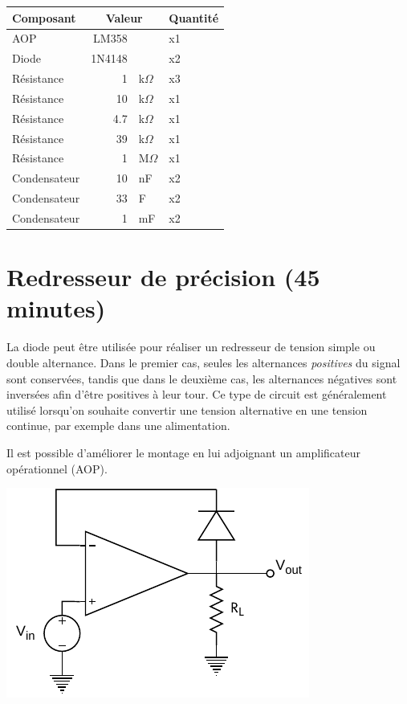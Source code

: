 \documentclass{../template/labo}
\begin{document}
\begin{center}
	\begin{tabular}{p{}rlp{}}
		Composant & \multicolumn{2}{c}{Valeur} & Quantité \\\toprule
		\multirow{1}{*}{AOP} & LM358 & & x1 \\\midrule
		\multirow{1}{*}{Diode} & 1N4148 & & x2 \\\midrule
		\multirow{1}{*}{Résistance} 	& 1 & k$\Omega$ & x3 \\\midrule
		\multirow{1}{*}{Résistance} 	& 10 & k$\Omega$ & x1 \\\midrule
		\multirow{1}{*}{Résistance} 	& 4.7 & k$\Omega$ & x1 \\\midrule
		\multirow{1}{*}{Résistance} 	& 39 & k$\Omega$ & x1 \\\midrule
		\multirow{1}{*}{Résistance} 	& 1 & M$\Omega$ & x1 \\\midrule
		\multirow{1}{*}{Condensateur} 	& 10 & nF & x2 \\\midrule
		\multirow{1}{*}{Condensateur} 	& 33 & \textmu F & x2 \\\midrule
		\multirow{1}{*}{Condensateur} 	& 1 & mF & x2 \\\bottomrule
	\end{tabular}
\end{center}

\section{Redresseur de précision (45 minutes)}
La diode peut être utilisée pour réaliser un redresseur de tension simple ou double alternance.
Dans le premier cas, seules les alternances \textit{positives} du signal sont conservées, tandis que dans le deuxième cas, les alternances négatives sont inversées afin d'être positives à leur tour.
Ce type de circuit est généralement utilisé lorsqu'on souhaite convertir une tension alternative en une tension continue, par exemple dans une alimentation.

Il est possible d'améliorer le montage en lui adjoignant un amplificateur opérationnel (AOP).
\begin{center}
	\includegraphics[width=.5\textwidth]{precision-rectifier.pdf}
\end{center}
\end{document}
